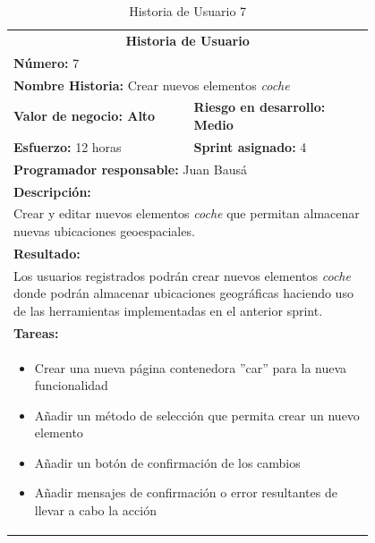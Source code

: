 	\begin{table}[H]
	  \centering 
	 	\begin{tabular}{p{0.4\linewidth}p{0.4\linewidth}}
	    \toprule
	    \multicolumn{2}{c}{\cellcolor{black!30}\textbf{Historia de Usuario}} 													\\
		\multicolumn{2}{l}{\cellcolor{gray!25}\textbf{Número: }7}																\\
		\multicolumn{2}{l}{\textbf{Nombre Historia: } Crear nuevos elementos \textit{coche}}				\\
		\cellcolor{gray!25}\textbf{Valor de negocio: Alto}	&	\cellcolor{gray!25}\textbf{Riesgo en desarrollo: Medio}		\\
		\textbf{Esfuerzo:} 12 horas				&	\textbf{Sprint asignado: }4												\\
		\multicolumn{2}{l}{\cellcolor{gray!25}\textbf{Programador responsable: }Juan Bausá}									\\
		\multicolumn{2}{l}{\textbf{Descripción:}}                                                     						\\
		\multicolumn{2}{l}{\parbox{15cm}{Crear y editar nuevos elementos \textit{coche} que permitan almacenar nuevas ubicaciones geoespaciales.}}				\\
		\multicolumn{2}{l}{\cellcolor{gray!25}\textbf{Resultado:}}																\\		
		\multicolumn{2}{l}{\parbox{15cm}{Los usuarios registrados podrán crear nuevos elementos \textit{coche} donde podrán almacenar ubicaciones geográficas haciendo uso de las herramientas implementadas en el anterior sprint.}}																	\\
		\multicolumn{2}{l}{\textbf{Tareas:}}																					\\
		\multicolumn{2}{l}{
			\begin{minipage}{12cm}
	    		\vskip 4pt
	    		\begin{itemize}
	    			\item Crear una nueva página contenedora ''car'' para la nueva funcionalidad
	    			\item Añadir un método de selección que permita crear un nuevo elemento
	    			\item Añadir un botón de confirmación de los cambios
	    			\item Añadir mensajes de confirmación o error resultantes de llevar a cabo la acción
				\end{itemize}
			  	\vskip 4pt
		 	\end{minipage}
		} \\																				
	    \hline
	  \end{tabular}
	  \caption{Historia de Usuario 7}
	\end{table}
	
